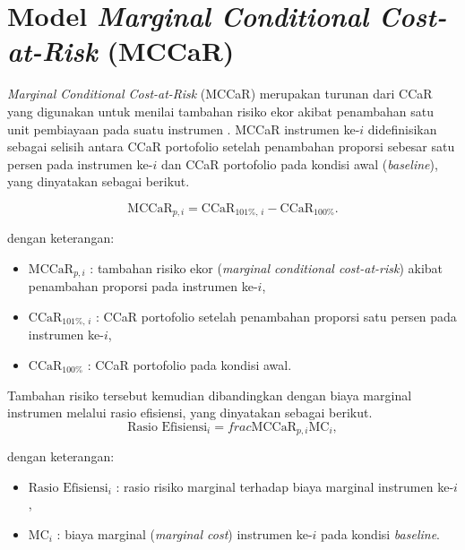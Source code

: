 
\section{Model \textit{Marginal Conditional Cost-at-Risk} (MCCaR)} \label{sec:mccar}

\textit{Marginal Conditional Cost-at-Risk} (MCCaR) merupakan turunan dari CCaR yang digunakan untuk menilai tambahan risiko ekor akibat penambahan satu unit pembiayaan pada suatu instrumen . MCCaR instrumen ke-$i$ didefinisikan sebagai selisih antara CCaR portofolio setelah penambahan proporsi sebesar satu persen pada instrumen ke-$i$ dan CCaR portofolio pada kondisi awal (\textit{baseline}), yang dinyatakan sebagai berikut.

\begin{equation}
    \label{eq:mccar}
    \mathrm{MCCaR}_{p,i} =
    \mathrm{CCaR}_{101\%,\,i} - \mathrm{CCaR}_{100\%}.
\end{equation}

dengan keterangan:
\begin{itemize}
    \item $\mathrm{MCCaR}_{p,i}$ : tambahan risiko ekor (\textit{marginal
        conditional cost-at-risk}) akibat penambahan proporsi pada instrumen
        ke-$i$,
    \item $\mathrm{CCaR}_{101\%,\,i}$ : CCaR portofolio setelah penambahan
        proporsi satu persen pada instrumen ke-$i$,
    \item $\mathrm{CCaR}_{100\%}$ : CCaR portofolio pada kondisi awal.
\end{itemize}

Tambahan risiko tersebut kemudian dibandingkan dengan biaya marginal instrumen melalui rasio efisiensi, yang dinyatakan sebagai berikut.
\begin{equation}
    \label{eq:rasio-efisiensi}
    \text{Rasio Efisiensi}_i = frac{\mathrm{MCCaR}_{p,i}}{\mathrm{MC}_i},
\end{equation}

dengan keterangan:
\begin{itemize}
    \item $\text{Rasio Efisiensi}_i$ : rasio risiko marginal terhadap biaya marginal instrumen ke-$i$,
    \item $\mathrm{MC}_i$ : biaya marginal (\textit{marginal cost}) instrumen ke-$i$ pada kondisi \textit{baseline}.
\end{itemize}

